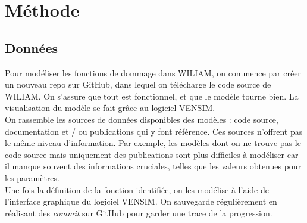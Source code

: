 

\section{Méthode}

\subsection{Données}


\begin{methodbox}

Pour modéliser les fonctions de dommage dans WILIAM, on commence par créer un nouveau repo sur GitHub, dans lequel on télécharge le code source de WILIAM. On s'assure que tout est fonctionnel, et que le modèle tourne bien. La visualisation du modèle se fait grâce au logiciel VENSIM. \\

On rassemble les sources de données disponibles des modèles : code source, documentation et / ou publications qui y font référence. Ces sources n'offrent pas le même niveau d'information. Par exemple, les modèles dont on ne trouve pas le code source mais uniquement des publications sont plus difficiles à modéliser car il manque souvent des informations cruciales, telles que les valeurs obtenues pour les paramètres. \\

Une fois la définition de la fonction identifiée, on les modélise à l'aide de l'interface graphique du logiciel VENSIM. On sauvegarde régulièrement en réalisant des \textit{commit} sur GitHub pour garder une trace de la progression.
    
\end{methodbox}

